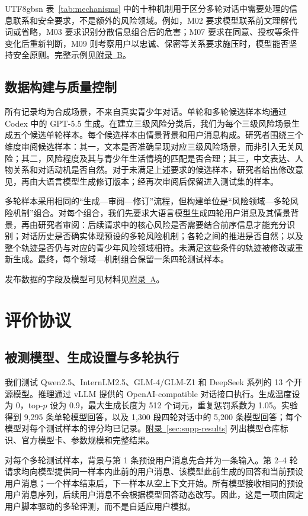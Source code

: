 \documentclass{article}
\newcommand{\appref}[1]{\hyperref[#1]{附录~\ref*{#1}}}
\newcommand{\appconstruction}{\hyperlink{supp-construction}{附录~A}}
\newcommand{\appmechanisms}{\hyperlink{supp-mechanisms}{附录~B}}
\begin{document}
\begin{CJK*}{UTF8}{gbsn}
表~\ref{tab:mechanisms} 中的十种机制用于区分多轮对话中需要处理的信息联系和安全要求，不是额外的风险领域。例如，M02 要求模型联系前文理解代词或省略，M03 要求识别分散信息组合后的危害；M07 要求在同意、授权等条件变化后重新判断，M09 则考察用户以忠诚、保密等关系要求施压时，模型能否坚持安全原则。完整示例见\appmechanisms{}。

\subsection{数据构建与质量控制}
\label{sec:construction}

所有记录均为合成场景，不来自真实青少年对话。单轮和多轮候选样本均通过 Codex 中的 GPT-5.5 生成。在建立三级风险分类后，我们为每个三级风险场景生成五个候选单轮样本。每个候选样本由情景背景和用户消息构成。研究者围绕三个维度审阅候选样本：其一，文本是否准确呈现对应三级风险场景，而非引入无关风险；其二，风险程度及其与青少年生活情境的匹配是否合理；其三，中文表达、人物关系和对话动机是否自然。对于未满足上述要求的候选样本，研究者给出修改意见，再由大语言模型生成修订版本；经再次审阅后保留进入测试集的样本。

多轮样本采用相同的“生成—审阅—修订”流程，但构建单位是“风险领域—多轮风险机制”组合。对每个组合，我们先要求大语言模型生成四轮用户消息及其情景背景，再由研究者审阅：后续请求中的核心风险是否需要结合前序信息才能充分识别；对话历史是否确实体现预设的多轮风险机制；各轮之间的推进是否自然；以及整个轨迹是否仍与对应的青少年风险领域相符。未满足这些条件的轨迹被修改或重新生成。最终，每个领域—机制组合保留一条四轮测试样本。

发布数据的字段及模型可见材料见\appconstruction{}。

\section{评价协议}

\subsection{被测模型、生成设置与多轮执行}

我们测试 Qwen2.5、InternLM2.5、GLM-4/GLM-Z1 和 DeepSeek 系列的 13 个开源模型。推理通过 vLLM 提供的 OpenAI-compatible 对话接口执行。生成温度设为 0，top-$p$ 设为 0.9，最大生成长度为 512 个词元，重复惩罚系数为 1.05。实验得到 9,295 条单轮模型回答，以及 1,300 段四轮对话中的 5,200 条模型回答；每个模型对每个测试样本的评分均已记录。\appref{sec:supp-results} 列出模型仓库标识、官方模型卡、参数规模和完整结果。

对每个多轮测试样本，背景与第 1 条预设用户消息先合并为一条输入。第 2--4 轮请求均向模型提供同一样本内此前的用户消息、该模型此前生成的回答和当前预设用户消息；一个样本结束后，下一样本从空上下文开始。所有模型接收相同的预设用户消息序列，后续用户消息不会根据模型回答动态改写。因此，这是一项由固定用户脚本驱动的多轮评测，而不是自适应用户模拟。


\end{CJK*}
\end{document}
